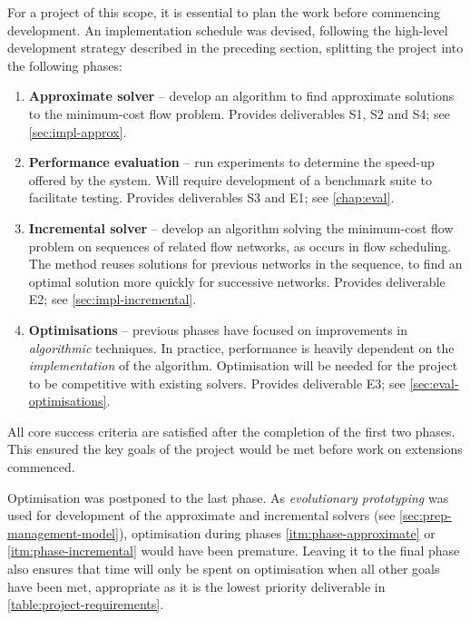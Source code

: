 For a project of this scope, it is essential to plan the work before commencing development. An implementation schedule was devised, following the high-level development strategy described in the preceding section, splitting the project into the following phases:

\begin{enumerate}
    \item \label{itm:phase-approximate}
        \textbf{Approximate solver} -- develop an algorithm to find approximate solutions to the minimum-cost flow problem. Provides deliverables S1, S2 and S4; see \cref{sec:impl-approx}.
    \item \label{itm:phase-evaluation} 
        \textbf{Performance evaluation} -- run experiments to determine the speed-up offered by the system. Will require development of a benchmark suite to facilitate testing. Provides deliverables S3 and E1; see \cref{chap:eval}.
    \item \label{itm:phase-incremental} 
        \textbf{Incremental solver} -- develop an algorithm solving the minimum-cost flow problem on sequences of related flow networks, as occurs in flow scheduling. The method reuses solutions for previous networks in the sequence, to find an optimal solution more quickly for successive networks. Provides deliverable E2; see \cref{sec:impl-incremental}.
    \item \label{itm:phase-optimisations}
        \textbf{Optimisations} -- previous phases have focused on improvements in \emph{algorithmic} techniques. In practice, performance is heavily dependent on the \emph{implementation} of the algorithm. Optimisation will be needed for the project to be competitive with existing solvers. Provides deliverable E3; see \cref{sec:eval-optimisations}.
\end{enumerate}

All core success criteria are satisfied after the completion of the first two phases\footnotemark. This ensured the key goals of the project would be met before work on extensions commenced. 

Optimisation was postponed to the last phase. As \emph{evolutionary prototyping} was used for development of the approximate and incremental solvers (see \ref{sec:prep-management-model}), optimisation during phases \ref{itm:phase-approximate} or \ref{itm:phase-incremental} would have been premature. Leaving it to the final phase also ensures that time will only be spent on optimisation when all other goals have been met, appropriate as it is the lowest priority deliverable in \ref{table:project-requirements}.

